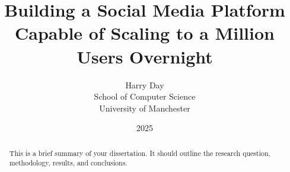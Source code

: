 \documentclass[12pt,a4paper]{report}
\title{Building a Social Media Platform Capable of Scaling to a Million Users Overnight}
\author{Harry Day\\School of Computer Science\\University of Manchester}
\date{2025}
\makeatletter
\def\@supervisor{}
\renewcommand{\maketitle}{
  \begin{titlepage}
    \centering
    {\Large \bfseries \@title \par}
    \vskip 1.5cm
    {\large \@author \par}
    \vskip 0.5cm
    {\large \@supervisor \par}
    \vskip 0.5cm
    {\large \@date \par}
    \vfill
  \end{titlepage}
}
\makeatother
\begin{document}
\maketitle

\begin{abstract}
  This is a brief summary of your dissertation. It should outline the research question, methodology, results, and conclusions. 
\end{abstract}

\tableofcontents
\listoffigures
\listoftables
\lstlistoflistings













\end{document}
